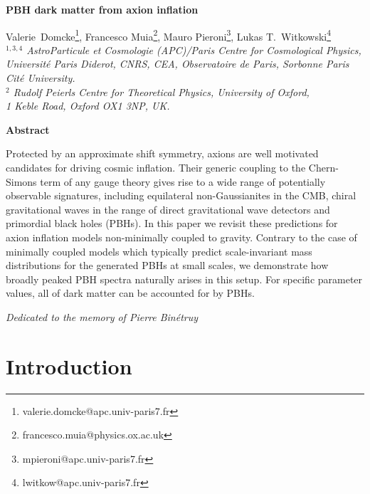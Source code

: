 \documentclass[12pt,titlepage]{article}
\numberwithin{equation}{section}
\numberwithin{figure}{section}
\numberwithin{table}{section}
\begin{document}
\begin{titlepage}

\thispagestyle{empty}
\setcounter{page}{0}



\vskip 1.5cm

\begin{center}
{\LARGE\bf PBH dark matter from axion inflation}

\vskip 2cm


{\large  Valerie~Domcke\footnote{valerie.domcke@apc.univ-paris7.fr},  Francesco Muia\footnote{francesco.muia@physics.ox.ac.uk}, Mauro Pieroni\footnote{mpieroni@apc.univ-paris7.fr}, \newline Lukas T.~Witkowski\footnote{lwitkow@apc.univ-paris7.fr}}\\[3mm]
{\it{
${}^{1,3,4}$ AstroParticule et Cosmologie (APC)/Paris Centre for Cosmological Physics, Universit\'e Paris Diderot, CNRS, CEA, Observatoire de Paris, Sorbonne Paris Cit\'e University.  \\
${}^2$ Rudolf Peierls Centre for Theoretical Physics, University of Oxford,\\
1 Keble Road, Oxford OX1 3NP, UK.
}}
\end{center}


\vskip 1cm
\centerline{ {\bf Abstract}}{
Protected by an approximate shift symmetry, axions are well motivated candidates for driving cosmic inflation. Their generic coupling to the Chern-Simons term of any gauge theory gives rise to a wide range of potentially observable signatures, including equilateral non-Gaussianites in the CMB, chiral gravitational waves in the range of direct gravitational wave detectors and primordial black holes (PBHs). In this paper we revisit these predictions for axion inflation models non-minimally coupled to gravity. Contrary to the case of minimally coupled models which typically predict scale-invariant mass distributions for the generated PBHs at small scales, we demonstrate how broadly peaked PBH spectra naturally arises in this setup. For specific parameter values, all of dark matter can be accounted for by PBHs.}

\vspace{1cm}

\center
\textit{Dedicated to the memory of Pierre Bin\'etruy}

\end{titlepage}
\tableofcontents

\section{Introduction\label{sec:introduction}}

\end{document}
